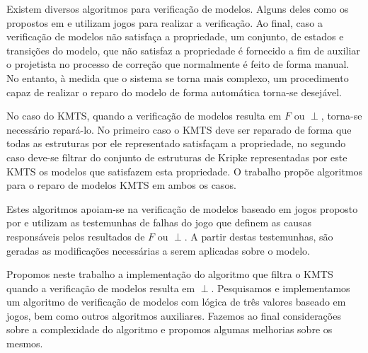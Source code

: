 \documentclass[normaltoc,capchap,capsec,times]{abnt}
\begin{document}
Existem diversos algoritmos para verificação de modelos. Alguns deles como os propostos em \cite{grumbergalg} e \cite{grumberglosing} utilizam jogos para realizar a verificação. Ao final, caso a verificação de modelos não satisfaça a propriedade, um  conjunto, de estados e transições do modelo, que não satisfaz a propriedade é fornecido a fim de auxiliar o projetista no processo de correção que normalmente é feito de forma manual. No entanto, à medida que o sistema se torna mais complexo, um procedimento capaz de realizar o reparo do modelo de forma automática torna-se desejável.



No caso do KMTS, quando a verificação de modelos resulta em $F$ ou $\perp$, torna-se necessário repará-lo.
No primeiro caso o KMTS deve ser reparado de forma que todas as estruturas por ele representado satisfaçam a propriedade, no segundo caso deve-se filtrar do conjunto de estruturas de Kripke representadas por este KMTS os modelos que satisfazem esta propriedade. O trabalho \cite{aline} propõe algoritmos para o reparo de modelos KMTS em ambos os casos.

Estes algoritmos apoiam-se  na verificação de modelos baseado em jogos proposto por \cite{grumberglosing} e utilizam as testemunhas de falhas do jogo que definem as causas responsáveis pelos resultados de $F$ ou $\perp$. %
A partir destas testemunhas, são geradas as modificações necessárias a serem aplicadas sobre o modelo.

Propomos neste trabalho a implementação do algoritmo que filtra o KMTS quando a verificação de modelos resulta em $\perp$. Pesquisamos e implementamos um algoritmo de verificação de modelos com lógica de três valores baseado em jogos, bem como outros algoritmos auxiliares. Fazemos ao final considerações sobre a complexidade do algoritmo e propomos algumas melhorias sobre os mesmos.
\end{document}
